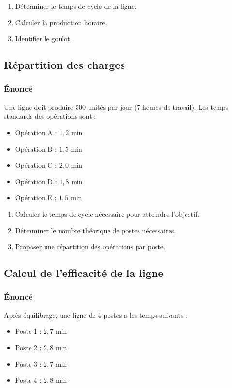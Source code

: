 \documentclass[a4paper,12pt]{article}
\begin{document}
\begin{enumerate}
    \item Déterminer le temps de cycle de la ligne.
    \item Calculer la production horaire.
    \item Identifier le goulot.
\end{enumerate}

\subsection{Répartition des charges}

\subsubsection*{Énoncé}

Une ligne doit produire $500$ unités par jour ($7$ heures de travail). Les temps standards des opérations sont :

\begin{itemize}
    \item Opération A : $1,2$ min
    \item Opération B : $1,5$ min
    \item Opération C : $2,0$ min
    \item Opération D : $1,8$ min
    \item Opération E : $1,5$ min
\end{itemize}

\begin{enumerate}
    \item Calculer le temps de cycle nécessaire pour atteindre l'objectif.
    \item Déterminer le nombre théorique de postes nécessaires.
    \item Proposer une répartition des opérations par poste.
\end{enumerate}

\subsection{Calcul de l'efficacité de la ligne}

\subsubsection*{Énoncé}

Après équilibrage, une ligne de $4$ postes a les temps suivants :
\begin{itemize}
    \item Poste 1 : $2,7$ min
    \item Poste 2 : $2,8$ min
    \item Poste 3 : $2,7$ min
    \item Poste 4 : $2,8$ min
\end{itemize}
\end{document}
